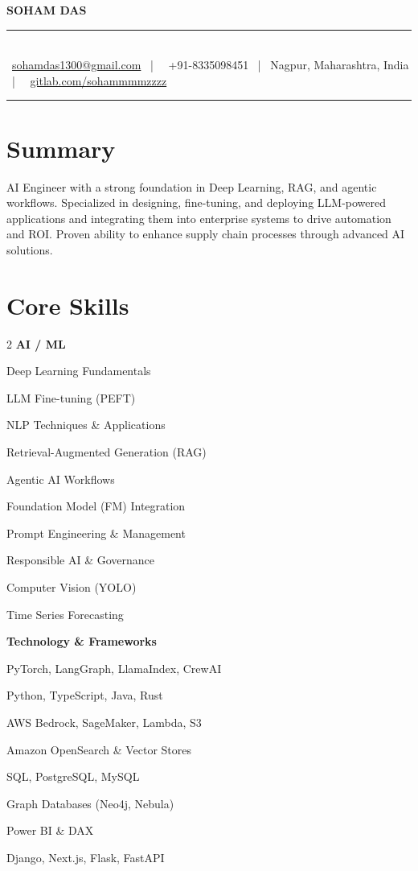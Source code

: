 \documentclass[letterpaper,10pt]{article}
\newcommand{\documentTitle}[2]{%
  \begin{center}
    {\Large\color{accentTitle}\textbf{#1}}\\[-1pt]
    {\color{accentLine}\rule{0.9\textwidth}{0.5pt}}\\[-1pt]
    {\footnotesize #2}\\[-2pt]
    {\color{accentLine}\rule{0.9\textwidth}{0.5pt}}
  \end{center}
}
\newenvironment{resume_list}{%
  \vspace{2pt}\begin{itemize}[leftmargin=20pt,itemsep=2pt,parsep=0pt,topsep=0pt]
}{%
  \end{itemize}\vspace{2pt}
}
\begin{document}
\documentTitle{SOHAM DAS}{%
  \faEnvelope\ \href{mailto:sohamdas1300@gmail.com}{sohamdas1300@gmail.com} ~|~
  \faPhone\ +91-8335098451 ~|~ Nagpur, Maharashtra, India ~|~
  \faGitlab\ \href{https://gitlab.com/sohammmmzzzz}{gitlab.com/sohammmmzzzz}
}

\section*{Summary}
AI Engineer with a strong foundation in Deep Learning, RAG, and agentic workflows. Specialized in designing, fine-tuning, and deploying LLM-powered applications and integrating them into enterprise systems to drive automation and ROI. Proven ability to enhance supply chain processes through advanced AI solutions.

\section*{Core Skills}
\begin{multicols}{2}
\textbf{AI / ML}
\begin{resume_list}
  \item Deep Learning Fundamentals
  \item LLM Fine-tuning (PEFT)
  \item NLP Techniques \& Applications
  \item Retrieval-Augmented Generation (RAG)
  \item Agentic AI Workflows
  \item Foundation Model (FM) Integration    %
  \item Prompt Engineering \& Management    %
  \item Responsible AI \& Governance         %
  \item Computer Vision (YOLO)
  \item Time Series Forecasting
\end{resume_list}

\columnbreak

\textbf{Technology \& Frameworks}
\begin{resume_list}
  \item PyTorch, LangGraph, LlamaIndex, CrewAI
  \item Python, TypeScript, Java, Rust
  \item AWS Bedrock, SageMaker, Lambda, S3  %
  \item Amazon OpenSearch \& Vector Stores  %
  \item SQL, PostgreSQL, MySQL
  \item Graph Databases (Neo4j, Nebula)
  \item Power BI \& DAX
  \item Django, Next.js, Flask, FastAPI
\end{resume_list}
\end{multicols}
\end{document}
